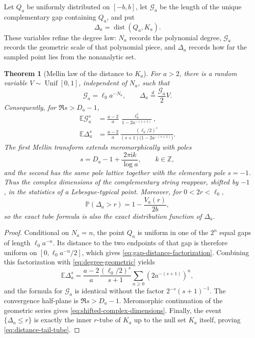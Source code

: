 \documentclass[11pt,oneside]{article}
\newtheorem{theorem}{Theorem}[section]
\theoremstyle{definition}
\theoremstyle{remark}
\newcommand{\Z}{\mathbb Z}
\newcommand{\ii}{\mathrm i}
\newcommand{\E}{\mathbb E}
\newcommand{\Prob}{\mathbb P}
\newcommand{\dist}{\operatorname{dist}}
\begin{document}
Let $Q_a$ be uniformly distributed on $[-b,b]$, let $\mathcal G_a$ be the length of the
unique complementary gap containing $Q_a$, and put
\begin{equation}
 \Delta_a=\dist(Q_a,K_a).
 \label{eq:Delta-a}
\end{equation}
These variables refine the degree law: $N_a$ records the polynomial degree, $\mathcal G_a$
records the geometric scale of that polynomial piece, and $\Delta_a$ records how far the
sampled point lies from the nonanalytic set.

\begin{theorem}[Mellin law of the distance to $K_a$]
\label{thm:distance-Mellin}
For $a>2$, there is a random variable $V\sim\operatorname{Unif}[0,1]$, independent of
$N_a$, such that
\begin{equation}
 \mathcal G_a=\ell_0a^{-N_a},
 \qquad
 \Delta_a\stackrel{d}{=}\frac{\mathcal G_a}{2}V.
 \label{eq:gap-distance-factorization}
\end{equation}
Consequently, for $\Re s>D_a-1$,
\begin{align}
 \E \mathcal G_a^s
 &=\frac{a-2}{a}\,
   \frac{\ell_0^s}{1-2a^{-(s+1)}},
 \label{eq:gap-Mellin}\\
 \E \Delta_a^s
 &=\frac{a-2}{a}\,
   \frac{(\ell_0/2)^s}{(s+1)\bigl(1-2a^{-(s+1)}\bigr)}.
 \label{eq:distance-Mellin}
\end{align}
The first Mellin transform extends meromorphically with poles
\begin{equation}
 s=D_a-1+\frac{2\pi\ii k}{\log a},\qquad k\in\Z,
 \label{eq:shifted-complex-dimensions}
\end{equation}
and the second has the same pole lattice together with the elementary pole $s=-1$.
Thus the complex dimensions of the complementary string reappear, shifted by $-1$, in the
statistics of a Lebesgue-typical point.  Moreover, for $0<2r<\ell_0$,
\begin{equation}
 \Prob(\Delta_a>r)=1-\frac{V_a(r)}{2b},
 \label{eq:distance-tail-tube}
\end{equation}
so the exact tube formula is also the exact distribution function of $\Delta_a$.
\end{theorem}

\begin{proof}
Conditional on $N_a=n$, the point $Q_a$ is uniform in one of the $2^n$ equal gaps of length
$\ell_0a^{-n}$.  Its distance to the two endpoints of that gap is therefore uniform on
$[0,\ell_0a^{-n}/2]$, which gives \eqref{eq:gap-distance-factorization}.  Combining this
factorization with \eqref{eq:degree-geometric} yields
\[
 \E\Delta_a^s
 =\frac{a-2}{a}\frac{(\ell_0/2)^s}{s+1}
  \sum_{n\ge0}\left(2a^{-(s+1)}\right)^n,
\]
and the formula for $\mathcal G_a$ is identical without the factor $2^{-s}(s+1)^{-1}$.
The convergence half-plane is $\Re s>D_a-1$.  Meromorphic continuation of the geometric
series gives \eqref{eq:shifted-complex-dimensions}.  Finally, the event
$\{\Delta_a\le r\}$ is exactly the inner $r$-tube of $K_a$ up to the null set $K_a$
itself, proving \eqref{eq:distance-tail-tube}.
\end{proof}
\end{document}
